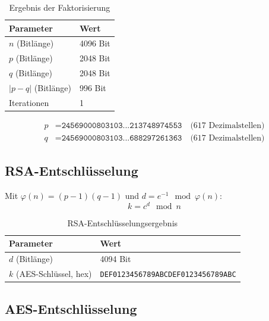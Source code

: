 \documentclass[
    fontsize=12pt,          %
    paper=a4,               %
    numbers=noenddot,       %
    listof=totoc,           %
    listof=entryprefix,     %
    listof=nochaptergap,    %
    bibliography=totoc,     %
    parskip=half,           %
    openany                 %
]{scrbook}
\begin{document}
\begin{table}[H]
    \centering
    \begin{tabular}{l l}
        \toprule
        \textbf{Parameter} & \textbf{Wert} \\
        \midrule
        $n$ (Bitlänge)     & 4096 Bit \\
        $p$ (Bitlänge)     & 2048 Bit \\
        $q$ (Bitlänge)     & 2048 Bit \\
        $|p - q|$ (Bitlänge) & 996 Bit \\
        Iterationen        & 1 \\
        \bottomrule
    \end{tabular}
    \caption{Ergebnis der Faktorisierung}
\end{table}

\begin{align*}
    p &= \texttt{24569000803103...213748974553} \quad \text{(617 Dezimalstellen)} \\
    q &= \texttt{24569000803103...688297261363} \quad \text{(617 Dezimalstellen)}
\end{align*}


\subsection*{RSA-Entschlüsselung}

Mit $\varphi(n) = (p-1)(q-1)$ und $d = e^{-1} \mod \varphi(n)$:
\[
    k = c^d \mod n
\]

\begin{table}[H]
    \centering
    \begin{tabular}{l l}
        \toprule
        \textbf{Parameter} & \textbf{Wert} \\
        \midrule
        $d$ (Bitlänge)     & 4094 Bit \\
        $k$ (AES-Schlüssel, hex) & \texttt{DEF0123456789ABCDEF0123456789ABC} \\
        \bottomrule
    \end{tabular}
    \caption{RSA-Entschlüsselungsergebnis}
\end{table}


\subsection*{AES-Entschlüsselung}
\end{document}
